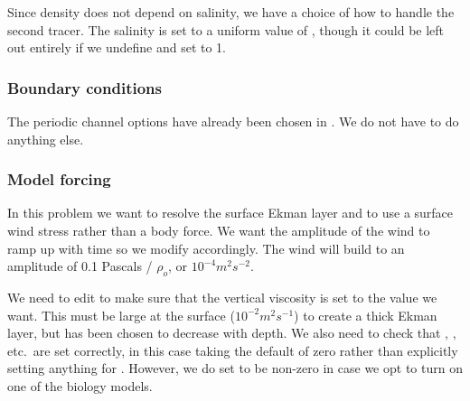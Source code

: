 Since density does not depend on salinity, we have a choice of how to
handle the second tracer. The salinity is set to a uniform value
of , though it could be left out entirely if we undefine
 and set  to 1.

\subsubsection{Boundary conditions}
The periodic channel options have already been chosen in
.  We do not have to do anything else.

\subsubsection{Model forcing}
In this problem we want to resolve the
surface Ekman layer and to use a surface wind stress rather than a body
force.  We want the amplitude of the wind to ramp up with time so we
modify  accordingly.
The wind will build to an amplitude of 0.1 Pascals / $\rho_o$,
or $10^{-4} m^2 s^{-2}$.

We need to edit  to make sure that the
vertical viscosity  is set to the value we want.  This
must be large at the surface ($10^{-2} m^2 s^{-1}$) to create a thick
Ekman layer, but has been chosen to decrease with depth.  We also need
to check that , , etc.\ are
set correctly, in this case taking the default of zero rather than
explicitly setting anything for . However, we do set
 to be non-zero in case we opt to turn on one of
the biology models.

